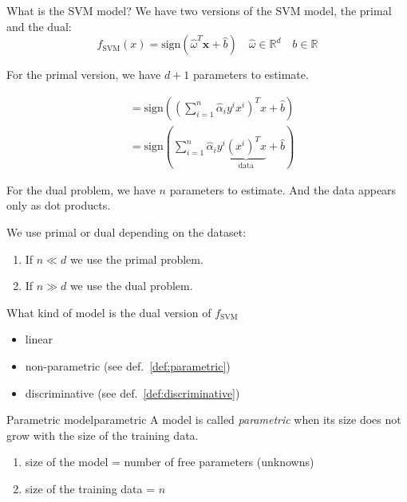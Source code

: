 \begin{question}{What is the SVM model?}{}
	We have two versions of the SVM model, the primal and the dual:
	\begin{equation*}
		f_\text{SVM}(x) = \text{sign} \left( \hat{\omega}^T \boldsymbol{x} + \hat{b} \right)
		\quad \hat\omega \in \mathds{R}^d
		\quad b \in \mathds{R}
		\tag{PRIMAL}
	\end{equation*}

	For the primal version, we have $d+1$ parameters to estimate.

	\begin{align*}
		 & = \text{sign} \left( \left(\sum_{i=1}^n \hat\alpha_i y^i x^i \right)^T x + \hat{b} \right) \\
		 & = \text{sign} \left( \sum_{i=1}^n \hat\alpha_i y^i
		\underbrace{(x^i)^T x}_{\text{data}} + \hat{b} \right)
		\tag{DUAL}
	\end{align*}

	For the dual problem, we have $n$ parameters to estimate.
	And the data appears only as dot products.

	\vspace{0.5em}
	We use primal or dual depending on the dataset:
	\begin{enumerate}
		\item If $n \ll d$ we use the primal problem.
		\item If $n \gg d$ we use the dual problem.
	\end{enumerate}
\end{question}

\begin{question}{What kind of model is the dual version of $f_\text{SVM}$}{}
	\begin{itemize}
		\item linear
		\item non-parametric (see def.~\ref{def:parametric})
		\item discriminative (see def.~\ref{def:discriminative})
	\end{itemize}
\end{question}

\begin{definition}{Parametric model}{parametric}
	A model is called \emph{parametric} when its size does not
	grow with the size of the training data.

	\begin{enumerate}
		\item size of the model = number of free parameters (unknowns)
		\item size of the training data = $n$
	\end{enumerate}
\end{definition}

